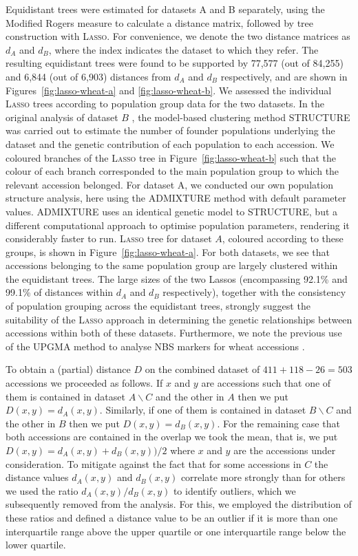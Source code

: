 Equidistant trees were estimated for datasets A and B separately, using the
Modified Rogers measure \cite{reif} to calculate a distance matrix, followed
by tree construction with \textsc{Lasso}. For convenience, we denote the two
distance matrices as $d_A$ and $d_B$, where the index indicates the dataset to
which they refer. The resulting equidistant trees were found to be supported
by 77,577 (out of 84,255) and 6,844 (out of 6,903) distances from $d_A$ and
$d_B$ respectively, and are shown in Figures~\ref{fig:lasso-wheat-a} and
\ref{fig:lasso-wheat-b}.  We assessed the individual \textsc{Lasso} trees
according to population group data for the two datasets. In the original
analysis of dataset $B$ \cite{muge}, the model-based clustering method
STRUCTURE \cite{structure} was carried out to estimate the number of founder
populations underlying the dataset and the genetic contribution of each
population to each accession. We coloured branches of the \textsc{Lasso} tree
in Figure~\ref{fig:lasso-wheat-b} such that the colour of each branch
corresponded to the main population group to which the relevant accession
belonged.  For dataset A, we conducted our own population structure analysis,
here using the ADMIXTURE method \cite{admixture} with default parameter
values.  ADMIXTURE uses an identical genetic model to STRUCTURE, but a
different computational approach to optimise population parameters, rendering
it considerably faster to run.  \textsc{Lasso} tree for dataset $A$, coloured
according to these groups, is shown in Figure~\ref{fig:lasso-wheat-a}. For
both datasets, we see that accessions belonging to the same population group
are largely clustered within the equidistant trees. The large sizes of the two
Lassos (encompassing 92.1\% and 99.1\% of distances within $d_A$ and $d_B$
respectively), together with the consistency of population grouping across the
equidistant trees, strongly suggest the suitability of the \textsc{Lasso}
approach in determining the genetic relationships between accessions within
both of these datasets. Furthermore, we note the previous use of the
\textsc{UPGMA} method to analyse NBS markers for wheat accessions
\cite{mantovani06nbs}.

To obtain a (partial) distance $D$ on the combined dataset of $411+118-26=503$
accessions we proceeded as follows. If $x$ and $y$ are accessions such that
one of them is contained in dataset $A\backslash C$ and the other in $A$ then
we put $D(x,y)=d_A(x,y)$. Similarly, if one of them is contained in dataset
$B\backslash C$ and the other in $B$ then we put $D(x,y)=d_B(x,y)$. For the
remaining case that both accessions are contained in the overlap we took the
mean, that is, we put $D(x,y)=d_A(x,y)+d_B(x,y))/2$ where $x$ and $y$ are the
accessions under consideration.  To mitigate against the fact that for some
accessions in $C$ the distance values $d_A(x,y)$ and $d_B(x,y)$ correlate more
strongly than for others we used the ratio $d_A(x,y)/d_B(x,y)$ to identify
outliers, which we subsequently removed from the analysis. For this, we
employed the distribution of these ratios and defined a distance value to be
an outlier if it is more than one interquartile range above the upper quartile
or one interquartile range below the lower quartile.

